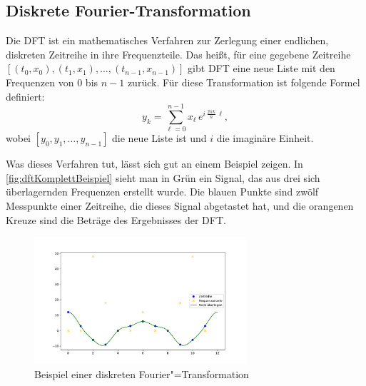 \subsection{Diskrete Fourier-Transformation}\label{subsec:dft}
Die \ac{DFT} ist ein mathematisches Verfahren zur Zerlegung einer endlichen, diskreten Zeitreihe in ihre Frequenzteile. Das heißt, für eine gegebene Zeitreihe $[(t_0,x_0),(t_1,x_1),\ldots,(t_{n-1},x_{n-1})]$ gibt \acs{DFT} eine neue Liste mit den Frequenzen von 0 bis $n-1$ zurück. Für diese Transformation ist folgende Formel definiert:
\[y_k=\sum_{\ell=0}^{n-1}x_\ell\,e^{i\,\tfrac{2\pi k}{n}\,\ell},\]
wobei $[y_0,y_1,\ldots,y_{n-1}]$ die neue Liste ist und $i$ die imaginäre Einheit.

Was dieses Verfahren tut, lässt sich gut an einem Beispiel zeigen. In \autoref{fig:dftKomplettBeispiel} sieht man in Grün ein Signal, das aus drei sich überlagernden Frequenzen erstellt wurde. Die blauen Punkte sind zwölf Messpunkte einer Zeitreihe, die dieses Signal abgetastet hat, und die orangenen Kreuze sind die Beträge des Ergebnisses der \acs{DFT}. 
\begin{figure}[bth] 
  \centering
  \includegraphics[width=0.7\textwidth]{Graphics/DFTExample1.pdf}
  \caption{Beispiel einer diskreten Fourier"=Transformation}
  \label{fig:dftKomplettBeispiel}
\end{figure}

